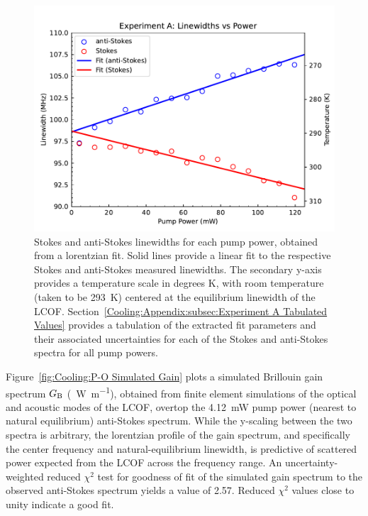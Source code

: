 \begin{figure}[t!]
  \centering
  \includegraphics[width=\textwidth]{figs/2-Cooling/P-O Linewidths.pdf}
  \caption[Stokes and anti-Stokes linewidths for each pump power, obtained from a lorentzian fit.]{Stokes and anti-Stokes linewidths for each pump power, obtained from a lorentzian fit. Solid lines provide a linear fit to the respective Stokes and anti-Stokes measured linewidths. The secondary y-axis provides a temperature scale in degrees \si{\kelvin}, with room temperature (taken to be \SI{293}{\kelvin}) centered at the equilibrium linewidth of the \ac{LCOF}. Section~\ref{Cooling:Appendix:subsec:Experiment A Tabulated Values} provides a tabulation of the extracted fit parameters and their associated uncertainties for each of the Stokes and anti-Stokes spectra for all pump powers.}
  \label{fig:Cooling:P-O Linewidths}
\end{figure}

Figure~\ref{fig:Cooling:P-O Simulated Gain} plots a simulated Brillouin gain spectrum \(G_{\rm B}\) (\si{\per\watt\per\meter}), obtained from finite element simulations \cite{johnson2023laser} of the optical and acoustic modes of the \ac{LCOF}, overtop the \SI{4.12}{\milli\watt} pump power (nearest to natural equilibrium) anti-Stokes spectrum. While the y-scaling between the two spectra is arbitrary, the lorentzian profile of the gain spectrum, and specifically the center frequency and natural-equilibrium linewidth, is predictive of scattered power expected from the \ac{LCOF} across the frequency range. An uncertainty-weighted reduced \(\chi^{2}\) test for goodness of fit of the simulated gain spectrum to the observed anti-Stokes spectrum yields a value of 2.57. Reduced \(\chi^{2}\) values close to unity indicate a good fit.

